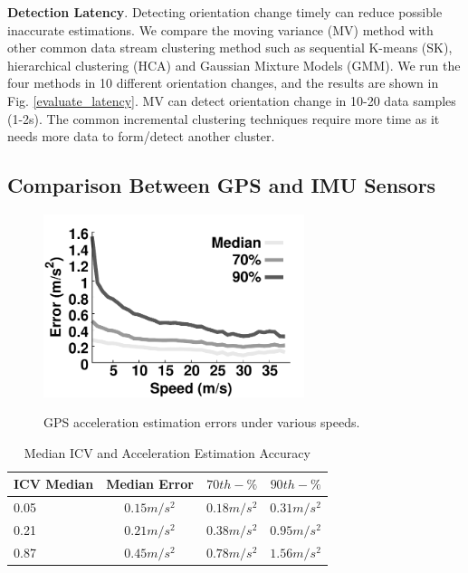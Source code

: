 \textbf{Detection Latency}. 
Detecting orientation change timely can reduce possible inaccurate 
estimations. 
We compare the moving variance (MV) method with other common
data stream clustering method such as 
sequential K-means (SK), hierarchical clustering (HCA) 
and Gaussian Mixture Models (GMM). 
We run the four methods in 10 different orientation changes, 
and the results are shown in Fig. \ref{evaluate_latency}. 
MV can detect orientation change in 10-20 data samples (1-2s). 
The common incremental clustering techniques require more
time as it needs more data to form/detect another cluster. 



\subsection{Comparison Between GPS and IMU Sensors}

\begin{figure}[!htbp]
\begin{center}
\includegraphics[width=3.0in, angle=0]{Figs/DriveSense/speed_acce_error.pdf}
\vspace{-0.2cm}
\caption{GPS acceleration estimation errors under various speeds.}
\vspace{-0.4cm}
\label{speed_acce_error}
\end{center}
\end{figure}




\begin{table}[!htbp]
        \centering
        \vspace{0.5cm}
        \caption[icv_accuracy]{Median ICV and Acceleration Estimation Accuracy}
         \vspace{0.0cm}
        \label{icv_accuracy}
                \begin{tabular}{|l|c|c|c|}
                \hline
ICV Median & Median Error & $70th-\%$ & $90th-\%$ 
\\  \hline      \hline
0.05 & $0.15m/s^2$  & $0.18m/s^2$ & $0.31m/s^2$ 
\\  \hline
0.21 & $0.21m/s^2$  &  $0.38m/s^2$ & $0.95m/s^2$   
\\  \hline
0.87 & $0.45m/s^2$ & $0.78m/s^2$ & $1.56m/s^2$   
\\  \hline
\end{tabular}
\end{table}


